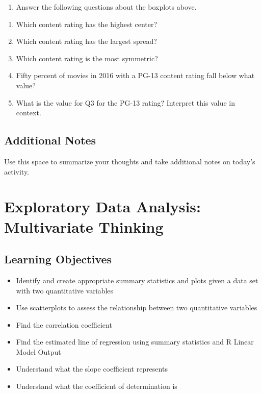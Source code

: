 \documentclass[
]{report}
\providecommand{\tightlist}{%
  \setlength{\itemsep}{0pt}\setlength{\parskip}{0pt}}
\begin{document}
\begin{enumerate}
\def\labelenumi{\arabic{enumi}.}
\setcounter{enumi}{10}
\tightlist
\item
  Answer the following questions about the boxplots above.
\end{enumerate}

\begin{enumerate}
\def\labelenumi{\alph{enumi}.}
\item
  Which content rating has the highest center?
  \vspace{0.5in}
\item
  Which content rating has the largest spread?
  \vspace{0.5in}
\item
  Which content rating is the most symmetric?
  \vspace{0.5in}
\item
  Fifty percent of movies in 2016 with a PG-13 content rating fall below what value?
  \vspace{0.5in}
\item
  What is the value for Q3 for the PG-13 rating? Interpret this value in context.
  \vspace{1in}
\end{enumerate}

\hypertarget{additional-notes-3}{%
\section{Additional Notes}\label{additional-notes-3}}

Use this space to summarize your thoughts and take additional notes on today's activity.

\hypertarget{exploratory-data-analysis-multivariate-thinking}{%
\chapter{Exploratory Data Analysis: Multivariate Thinking}\label{exploratory-data-analysis-multivariate-thinking}}

\hypertarget{learning-objectives-1}{%
\section{Learning Objectives}\label{learning-objectives-1}}

\begin{itemize}
\item
  Identify and create appropriate summary statistics and plots
  given a data set with two quantitative variables
\item
  Use scatterplots to assess the relationship between two quantitative variables
\item
  Find the correlation coefficient
\item
  Find the estimated line of regression using summary statistics and R Linear Model Output
\item
  Understand what the slope coefficient represents
\item
  Understand what the coefficient of determination is
\end{itemize}
\end{document}
